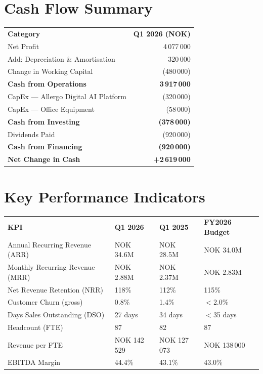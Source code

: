 \documentclass[a4paper,11pt]{article}
\begin{document}
\section{Cash Flow Summary}

\begin{tabularx}{\textwidth}{Xr}
  \rowcolor{brand}
  \color{white}\textbf{Category} & \color{white}\textbf{Q1 2026 (NOK)} \\
  \rowcolor{lightgray}
  Net Profit & 4\,077\,000 \\
  Add: Depreciation \& Amortisation & 320\,000 \\
  \rowcolor{lightgray}
  Change in Working Capital & (480\,000) \\
  \textbf{Cash from Operations} & \textbf{3\,917\,000} \\
  \midrule
  \rowcolor{lightgray}
  CapEx — Allergo Digital AI Platform & (320\,000) \\
  CapEx — Office Equipment & (58\,000) \\
  \rowcolor{lightgray}
  \textbf{Cash from Investing} & \textbf{(378\,000)} \\
  \midrule
  Dividends Paid & (920\,000) \\
  \rowcolor{lightgray}
  \textbf{Cash from Financing} & \textbf{(920\,000)} \\
  \midrule
  \rowcolor{brand}
  \color{white}\textbf{Net Change in Cash} & \color{white}\textbf{+2\,619\,000} \\
  \bottomrule
\end{tabularx}

\section{Key Performance Indicators}

\begin{tabularx}{\textwidth}{Xlll}
  \rowcolor{brand}
  \color{white}\textbf{KPI} &
  \color{white}\textbf{Q1 2026} &
  \color{white}\textbf{Q1 2025} &
  \color{white}\textbf{FY2026 Budget} \\
  \rowcolor{lightgray}
  Annual Recurring Revenue (ARR) & NOK 34.6M & NOK 28.5M & NOK 34.0M \\
  Monthly Recurring Revenue (MRR) & NOK 2.88M & NOK 2.37M & NOK 2.83M \\
  \rowcolor{lightgray}
  Net Revenue Retention (NRR) & 118\% & 112\% & 115\% \\
  Customer Churn (gross) & 0.8\% & 1.4\% & $<$2.0\% \\
  \rowcolor{lightgray}
  Days Sales Outstanding (DSO) & 27 days & 34 days & $<$35 days \\
  Headcount (FTE) & 87 & 82 & 87 \\
  \rowcolor{lightgray}
  Revenue per FTE & NOK 142\,529 & NOK 127\,073 & NOK 138\,000 \\
  EBITDA Margin & 44.4\% & 43.1\% & 43.0\% \\
  \bottomrule
\end{tabularx}
\end{document}
